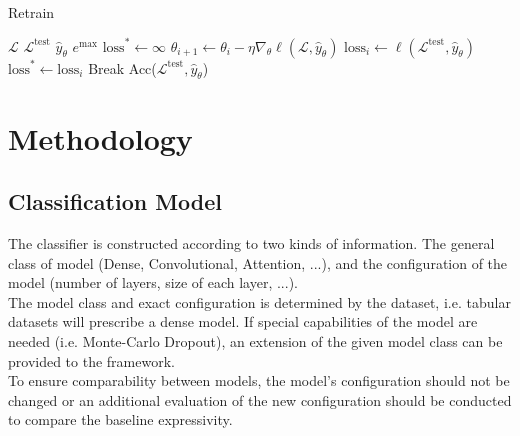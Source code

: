 \documentclass[]{article}
\begin{document}
\begin{algorithm}[H]
	\caption{Retrain}\label{alg:retrain}
	\begin{algorithmic}[1]
		\Require $\mathcal{L}$ 
		\Require $\mathcal{L}^\text{test}$ 
		\Require $\hat y_\theta$ 
		\Require $e^\text{max}$ 
		\State $\text{loss}^* \gets \infty$
			\State $\theta_{i+1} \gets \theta_i - \eta \nabla_\theta \ell(\mathcal{L}, \hat y_{\theta})$
			\State $\text{loss}_i \gets \ell(\mathcal{L}^\text{test}, \hat y_{\theta})$
				\State $\text{loss}^* \gets \text{loss}_i$
			\Else
				\State Break
			\EndIf
		\EndFor
		\State
		\Return Acc($\mathcal{L}^\text{test}, \hat y_{\theta}$)
	\end{algorithmic}
\end{algorithm}

\section{Methodology}

\subsection{Classification Model}
The classifier is constructed according to two kinds of information.
The general class of model (Dense, Convolutional, Attention, ...), and the configuration of the model (number of layers, size of each layer, ...). \\
The model class and exact configuration is determined by the dataset, i.e. tabular datasets will prescribe a dense model.
If special capabilities of the model are needed (i.e. Monte-Carlo Dropout), an extension of the given model class can be provided to the framework. \\ [1mm]
To ensure comparability between models, the model's configuration should not be changed or an additional evaluation of the new configuration should be conducted to compare the baseline expressivity.
\end{document}
